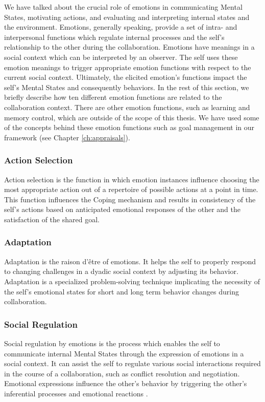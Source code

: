 \documentclass[12pt]{report}
\begin{document}
We have talked about the crucial role of emotions in communicating Mental
States, motivating actions, and evaluating and interpreting internal states and
the environment. Emotions, generally speaking, provide a set of intra- and
interpersonal functions which regulate internal processes and the self's
relationship to the other during the collaboration. Emotions have meanings in a
social context which can be interpreted by an observer. The self uses these
emotion meanings to trigger appropriate emotion functions with respect to the
current social context. Ultimately, the elicited emotion's functions impact the
self's Mental States and consequently behaviors. In the rest of this section, we
briefly describe how ten different emotion functions are related to the
collaboration context. There are other emotion functions, such as learning and
memory control, which are outside of the scope of this thesis. We have used some
of the concepts behind these emotion functions such as goal management in our
framework (see Chapter \ref{ch:appraisals}).

\subsubsection{Action Selection} Action selection is the function in which
emotion instances influence choosing the most appropriate action out of a
repertoire of possible actions at a point in time. This function influences the
Coping mechanism and results in consistency of the self's actions based on
anticipated emotional responses of the other and the satisfaction of the shared
goal.

\subsubsection{Adaptation} Adaptation is the raison d'\^{e}tre of emotions. It
helps the self to properly respond to changing challenges in a dyadic social
context by adjusting its behavior. Adaptation is a specialized problem-solving
technique implicating the necessity of the self's emotional states for short and
long term behavior changes during collaboration.

\subsubsection{Social Regulation} Social regulation by emotions is the process
which enables the self to communicate internal Mental States through the
expression of emotions in a social context. It can assist the self to regulate
various social interactions required in the course of a collaboration, such as
conflict resolution and negotiation. Emotional expressions influence the other's
behavior by triggering the other's inferential processes and emotional reactions
\cite{kleef:emotion-regulate-social}.
\end{document}
